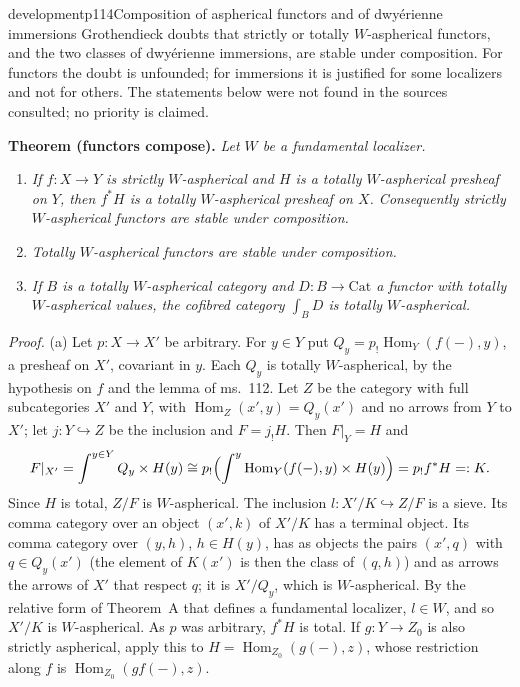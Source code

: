 \begin{dcomment}{development}{p114}{Composition of aspherical functors and of dwy\'erienne immersions}
Grothendieck doubts that strictly or totally $W$-aspherical functors, and the two classes of dwy\'erienne immersions, are stable under composition. For functors the doubt is unfounded; for immersions it is justified for some localizers and not for others. The statements below were not found in the sources consulted; no priority is claimed.

\textbf{Theorem (functors compose).}\ours
\textit{Let $W$ be a fundamental localizer.}
\begin{enumerate}[label=(\alph*)]
\item \textit{If $f:X\to Y$ is strictly $W$-aspherical and $H$ is a totally $W$-aspherical presheaf on $Y$, then $f^*H$ is a totally $W$-aspherical presheaf on $X$. Consequently strictly $W$-aspherical functors are stable under composition.}
\item \textit{Totally $W$-aspherical functors are stable under composition.}
\item \textit{If $B$ is a totally $W$-aspherical category and $D:B\to\mathrm{Cat}$ a functor with totally $W$-aspherical values, the cofibred category $\int_BD$ is totally $W$-aspherical.}
\end{enumerate}

\textit{Proof.}
(a) Let $p:X\to X'$ be arbitrary. For $y\in Y$ put $Q_y=p_!\operatorname{Hom}_Y(f(-),y)$, a presheaf on $X'$, covariant in $y$. Each $Q_y$ is totally $W$-aspherical, by the hypothesis on $f$ and the lemma of ms.~112. Let $Z$ be the category with full subcategories $X'$ and $Y$, with $\operatorname{Hom}_Z(x',y)=Q_y(x')$ and no arrows from $Y$ to $X'$; let $j:Y\hookrightarrow Z$ be the inclusion and $F=j_!H$. Then $F|_Y=H$ and
\[
 F|_{X'}=\int^{y\in Y}Q_y\times H(y)\cong p_!\Bigl(\int^{y}\operatorname{Hom}_Y(f(-),y)\times H(y)\Bigr)=p_!f^*H=:K .
\]
Since $H$ is total, $Z/F$ is $W$-aspherical. The inclusion $l:X'/K\hookrightarrow Z/F$ is a sieve. Its comma category over an object $(x',k)$ of $X'/K$ has a terminal object. Its comma category over $(y,h)$, $h\in H(y)$, has as objects the pairs $(x',q)$ with $q\in Q_y(x')$ (the element of $K(x')$ is then the class of $(q,h)$) and as arrows the arrows of $X'$ that respect $q$; it is $X'/Q_y$, which is $W$-aspherical. By the relative form of Theorem~A that defines a fundamental localizer, $l\in W$, and so $X'/K$ is $W$-aspherical. As $p$ was arbitrary, $f^*H$ is total. If $g:Y\to Z_0$ is also strictly aspherical, apply this to $H=\operatorname{Hom}_{Z_0}(g(-),z)$, whose restriction along $f$ is $\operatorname{Hom}_{Z_0}(gf(-),z)$.


\end{dcomment}
